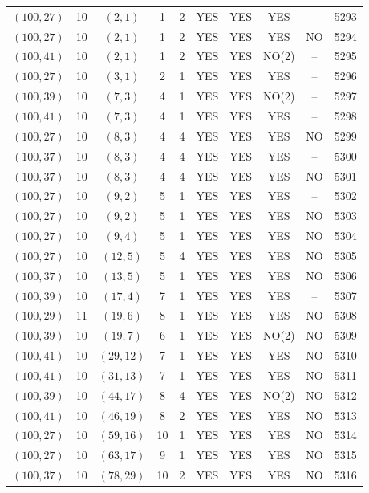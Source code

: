 \begin{longtable}{|c|c|c|c|c|c|c|c|c|c|}
$(100, 27)$ & 10 & $(2, 1)$ & 1 & 2 & YES & YES & YES & -- & 5293\\
$(100, 27)$ & 10 & $(2, 1)$ & 1 & 2 & YES & YES & YES & NO & 5294\\
$(100, 41)$ & 10 & $(2, 1)$ & 1 & 2 & YES & YES & NO(2) & -- & 5295\\
$(100, 27)$ & 10 & $(3, 1)$ & 2 & 1 & YES & YES & YES & -- & 5296\\
$(100, 39)$ & 10 & $(7, 3)$ & 4 & 1 & YES & YES & NO(2) & -- & 5297\\
$(100, 41)$ & 10 & $(7, 3)$ & 4 & 1 & YES & YES & YES & -- & 5298\\
$(100, 27)$ & 10 & $(8, 3)$ & 4 & 4 & YES & YES & YES & NO & 5299\\
$(100, 37)$ & 10 & $(8, 3)$ & 4 & 4 & YES & YES & YES & -- & 5300\\
$(100, 37)$ & 10 & $(8, 3)$ & 4 & 4 & YES & YES & YES & NO & 5301\\
$(100, 27)$ & 10 & $(9, 2)$ & 5 & 1 & YES & YES & YES & -- & 5302\\
$(100, 27)$ & 10 & $(9, 2)$ & 5 & 1 & YES & YES & YES & NO & 5303\\
$(100, 27)$ & 10 & $(9, 4)$ & 5 & 1 & YES & YES & YES & NO & 5304\\
$(100, 27)$ & 10 & $(12, 5)$ & 5 & 4 & YES & YES & YES & NO & 5305\\
$(100, 37)$ & 10 & $(13, 5)$ & 5 & 1 & YES & YES & YES & NO & 5306\\
$(100, 39)$ & 10 & $(17, 4)$ & 7 & 1 & YES & YES & YES & -- & 5307\\
$(100, 29)$ & 11 & $(19, 6)$ & 8 & 1 & YES & YES & YES & NO & 5308\\
$(100, 39)$ & 10 & $(19, 7)$ & 6 & 1 & YES & YES & NO(2) & NO & 5309\\
$(100, 41)$ & 10 & $(29, 12)$ & 7 & 1 & YES & YES & YES & NO & 5310\\
$(100, 41)$ & 10 & $(31, 13)$ & 7 & 1 & YES & YES & YES & NO & 5311\\
$(100, 39)$ & 10 & $(44, 17)$ & 8 & 4 & YES & YES & NO(2) & NO & 5312\\
$(100, 41)$ & 10 & $(46, 19)$ & 8 & 2 & YES & YES & YES & NO & 5313\\
$(100, 27)$ & 10 & $(59, 16)$ & 10 & 1 & YES & YES & YES & NO & 5314\\
$(100, 27)$ & 10 & $(63, 17)$ & 9 & 1 & YES & YES & YES & NO & 5315\\
$(100, 37)$ & 10 & $(78, 29)$ & 10 & 2 & YES & YES & YES & NO & 5316\\

\end{longtable}
